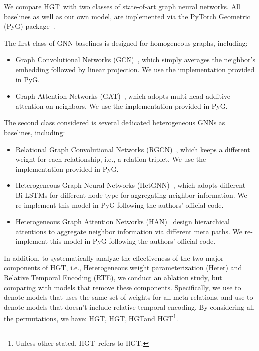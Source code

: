 \documentclass[sigconf]{acmart}
\theoremstyle{definition}
\newcommand{\short}{HGT}
\begin{document}
We compare \short\ with two classes of state-of-art graph neural networks. 
All baselines as well as our own model, 
are implemented via the PyTorch Geometric (PyG) package~\cite{pyG}. 


 The first class of GNN baselines is designed for homogeneous graphs, including:
\begin{itemize}
    \item Graph Convolutional Networks (GCN)~\cite{gcn}, which simply averages the neighbor's embedding followed by linear projection. We use the implementation provided in PyG.
    \item Graph Attention Networks (GAT)~\cite{gat}, which adopts multi-head additive attention on neighbors. We use the implementation provided in PyG. 
\end{itemize}

The second class considered is several dedicated heterogeneous GNNs as baselines,  including: \begin{itemize}
    \item Relational Graph Convolutional Networks (RGCN)~\cite{DBLP:conf/esws/SchlichtkrullKB18}, which keeps a different weight for each relationship, i.e., a relation triplet. We use the implementation provided in PyG.
    \item Heterogeneous Graph Neural Networks (HetGNN)~\cite{DBLP:conf/kdd/ZhangSHSC19}, which adopts different Bi-LSTMs for different node type for aggregating neighbor information. We re-implement this model in PyG following the authors' official code.
    \item Heterogeneous Graph Attention Networks (HAN)~\cite{DBLP:conf/www/WangJSWYCY19} design hierarchical attentions to aggregate neighbor information via different meta paths. We re-implement this model in PyG following the authors' official code.
\end{itemize}

In addition, to systematically analyze the effectiveness of the two major components of \short, i.e., Heterogeneous weight parameterization (Heter) and Relative Temporal Encoding (RTE), we conduct an ablation study, but comparing with models that remove these components. Specifically, we use  to denote models that uses the same set of weights for all meta relations, and use  to denote models that doesn't include relative temporal encoding. By considering all the permutations, we have: \short, \short, \short and \short\footnote{Unless other stated, \short\ refers to \short.}.
\end{document}
